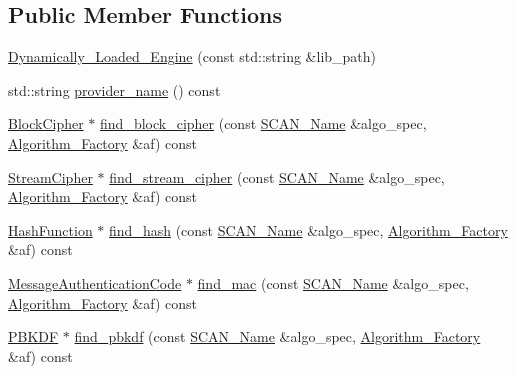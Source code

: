 \subsection*{Public Member Functions}
\begin{DoxyCompactItemize}
\item 
\hyperlink{classBotan_1_1Dynamically__Loaded__Engine_a3e414270acc3619b552e5e6c8abb155f}{Dynamically\-\_\-\-Loaded\-\_\-\-Engine} (const std\-::string \&lib\-\_\-path)
\item 
std\-::string \hyperlink{classBotan_1_1Dynamically__Loaded__Engine_a47315b28819c828fd8c8ec1f6a0498f7}{provider\-\_\-name} () const 
\item 
\hyperlink{classBotan_1_1BlockCipher}{Block\-Cipher} $\ast$ \hyperlink{classBotan_1_1Dynamically__Loaded__Engine_a523d93c8e2455620c2e93e94373224b4}{find\-\_\-block\-\_\-cipher} (const \hyperlink{classBotan_1_1SCAN__Name}{S\-C\-A\-N\-\_\-\-Name} \&algo\-\_\-spec, \hyperlink{classBotan_1_1Algorithm__Factory}{Algorithm\-\_\-\-Factory} \&af) const 
\item 
\hyperlink{classBotan_1_1StreamCipher}{Stream\-Cipher} $\ast$ \hyperlink{classBotan_1_1Dynamically__Loaded__Engine_a20f2beb3fa033e96133ef7b2ca4ce35f}{find\-\_\-stream\-\_\-cipher} (const \hyperlink{classBotan_1_1SCAN__Name}{S\-C\-A\-N\-\_\-\-Name} \&algo\-\_\-spec, \hyperlink{classBotan_1_1Algorithm__Factory}{Algorithm\-\_\-\-Factory} \&af) const 
\item 
\hyperlink{classBotan_1_1HashFunction}{Hash\-Function} $\ast$ \hyperlink{classBotan_1_1Dynamically__Loaded__Engine_a62762f66dc4fc5582271c2b17a77bd41}{find\-\_\-hash} (const \hyperlink{classBotan_1_1SCAN__Name}{S\-C\-A\-N\-\_\-\-Name} \&algo\-\_\-spec, \hyperlink{classBotan_1_1Algorithm__Factory}{Algorithm\-\_\-\-Factory} \&af) const 
\item 
\hyperlink{classBotan_1_1MessageAuthenticationCode}{Message\-Authentication\-Code} $\ast$ \hyperlink{classBotan_1_1Dynamically__Loaded__Engine_a486539b104d4fd89395a32d7c5256d0d}{find\-\_\-mac} (const \hyperlink{classBotan_1_1SCAN__Name}{S\-C\-A\-N\-\_\-\-Name} \&algo\-\_\-spec, \hyperlink{classBotan_1_1Algorithm__Factory}{Algorithm\-\_\-\-Factory} \&af) const 
\item 
\hyperlink{classBotan_1_1PBKDF}{P\-B\-K\-D\-F} $\ast$ \hyperlink{classBotan_1_1Dynamically__Loaded__Engine_a954496341fe86425f84657e89a11326c}{find\-\_\-pbkdf} (const \hyperlink{classBotan_1_1SCAN__Name}{S\-C\-A\-N\-\_\-\-Name} \&algo\-\_\-spec, \hyperlink{classBotan_1_1Algorithm__Factory}{Algorithm\-\_\-\-Factory} \&af) const 

\end{DoxyCompactItemize}

